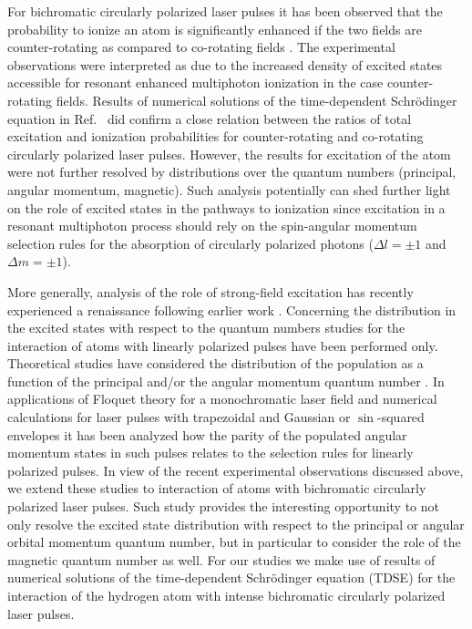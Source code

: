 For bichromatic circularly polarized laser pulses it has been observed that the probability to ionize an atom is significantly enhanced if the two fields are counter-rotating as compared to co-rotating fields \cite{mancuso2016}. The experimental observations were interpreted as due to the increased density of excited states accessible for resonant enhanced multiphoton ionization in the case counter-rotating fields. Results of numerical solutions of the time-dependent Schr\"odinger equation in Ref.\ \cite{mancuso2016} did confirm a close relation between the ratios of total excitation and ionization probabilities for counter-rotating and co-rotating circularly polarized laser pulses. However, the results for excitation of the atom were not further resolved by distributions over the quantum numbers (principal, angular momentum, magnetic). Such analysis potentially can shed further light on the role of excited states in the pathways to ionization since excitation in a resonant multiphoton process should rely on the spin-angular momentum selection rules for the absorption of circularly polarized photons ($\Delta l = \pm 1$ and $\Delta m = \pm 1$).

More generally, analysis of the role of strong-field excitation has recently experienced a renaissance 
\cite{nubbemeyer2008,eichmann2013,chini2014,zimmermann2015} 
following earlier work 
\cite{freeman1987,perry1989,agostini1989}.
Concerning the distribution in the excited states with respect to the quantum numbers studies for the interaction of atoms with linearly polarized pulses have been performed only. Theoretical studies have considered the distribution of the population as a function of the principal and/or the angular momentum quantum number \cite{krajewska2012,li2014,li2014b,xiong2017,piraux2017,venzke2018_ryd}. In applications of Floquet theory for a monochromatic laser field \cite{krajewska2012} and numerical calculations for laser pulses with  trapezoidal \cite{piraux2017} and Gaussian or $\sin$-squared envelopes \cite{venzke2018_ryd} it has been analyzed how the parity of the populated angular momentum states in such pulses relates to the selection rules for linearly polarized pulses. In view of the recent experimental observations discussed above, we extend these studies to interaction of atoms with bichromatic circularly polarized laser pulses. Such study provides the interesting opportunity to not only resolve the excited state distribution with respect to the principal or angular orbital momentum quantum number, but in particular to consider the role of the magnetic quantum number as well. For our studies we make use of results of numerical solutions of the time-dependent Schr\"odinger equation (TDSE) for the interaction of the hydrogen atom with intense bichromatic circularly polarized laser pulses.

